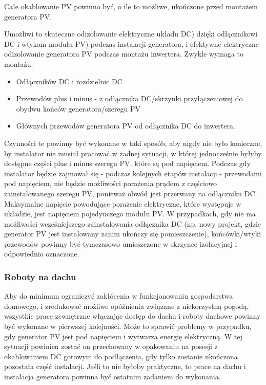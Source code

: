 \documentclass[12pt,a4paper]{article}
\begin{document}
Całe okablowanie PV powinno być, o ile to możliwe, ukończone przed 
montażem generatora PV. 

Umożliwi to skuteczne odizolowanie elektryczne układu DC) dzięki 
odłącznikowi DC i wtykom modułu PV) podczas instalacji generatora, i 
efektywne elektryczne odizolowanie generatora PV podczas montażu 
inwertera. Zwykle wymaga to montażu: 

\begin{itemize}
\item Odłączników DC i rozdzielnic DC 
\item Przewodów plus i minus - z odłącznika DC/skrzynki przyłączeniowej 
do obydwu końców generatora/szeregu PV 
\item Głównych przewodów generatora PV od odłącznika DC do inwertera. 
\end{itemize}
Czynności te powinny być wykonane w taki sposób, aby nigdy nie było 
konieczne, by instalator nie musiał pracować w żadnej sytuacji, w której 
jednocześnie byłyby dostępne części plus i minus szeregu PV, które są 
pod napięciem. Podczas gdy instalator będzie zajmował się - podczas 
kolejnych etapów instalacji - przewodami pod napięciem, nie będzie 
możliwości porażenia prądem z częściowo zainstalowanego szeregu PV, 
ponieważ obwód jest przerwany na odłączniku DC. Maksymalne napięcie 
powodujące porażenie elektryczne, które występuje w układzie, jest 
napięciem pojedynczego modułu PV. W przypadkach, gdy nie ma możliwości 
wcześniejszego zainstalowania odłącznika DC (np. nowy projekt, gdzie 
generator PV jest instalowany zanim ukończy się pomieszczenie), 
końcówki/wtyki przewodów powinny być tymczasowo umieszczone w skrzynce 
izolacyjnej i odpowiednio oznaczone. 

\subsubsection{Roboty na dachu}
Aby do minimum ograniczyć zakłócenia w 
funkcjonowaniu gospodarstwa domowego, i zredukować możliwe opóźnienia 
związane z niekorzystną pogodą, wszystkie prace zewnętrzne włączając 
dostęp do dachu i roboty dachowe powinny być wykonane w pierwszej 
kolejności. Może to sprawić problemy w przypadku, gdy generator PV jest 
pod napięciem i wytwarza energię elektryczną. W tej sytuacji powinien 
zostać on przechowany w opakowaniu na posesji z okablowaniem DC gotowym 
do podłączenia, gdy tylko zostanie ukończona pozostała część instalacji. 
Jeśli to nie byłoby praktyczne, to prace na dachu i instalacja 
generatora powinna być ostatnim zadaniem do wykonania. 
\end{document}
